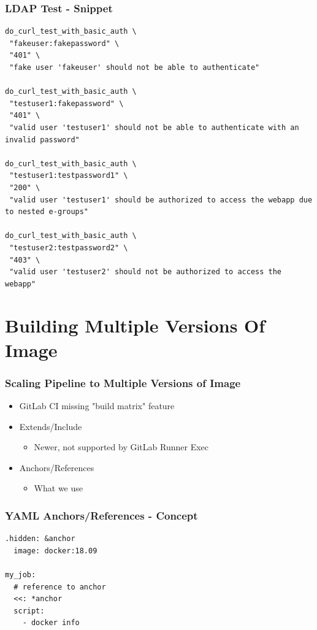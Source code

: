 \documentclass[14pt,aspectratio=169]{beamer}
\begin{document}
\begin{frame}[fragile]
  \frametitle{LDAP Test - Snippet}
  \begin{verbatim}
do_curl_test_with_basic_auth \
 "fakeuser:fakepassword" \
 "401" \
 "fake user 'fakeuser' should not be able to authenticate"

do_curl_test_with_basic_auth \
 "testuser1:fakepassword" \
 "401" \
 "valid user 'testuser1' should not be able to authenticate with an invalid password"

do_curl_test_with_basic_auth \
 "testuser1:testpassword1" \
 "200" \
 "valid user 'testuser1' should be authorized to access the webapp due to nested e-groups"

do_curl_test_with_basic_auth \
 "testuser2:testpassword2" \
 "403" \
 "valid user 'testuser2' should not be authorized to access the webapp"
  \end{verbatim}
\end{frame}

\section{Building Multiple Versions Of Image}

\begin{frame}[fragile]
  \frametitle{Scaling Pipeline to Multiple Versions of Image}
  \begin{itemize}
    \item GitLab CI missing "build matrix" feature
    \item Extends/Include
    \begin{itemize}
      \item Newer, not supported by GitLab Runner Exec
    \end{itemize}
    \item Anchors/References
    \begin{itemize}
      \item What we use
    \end{itemize}
  \end{itemize}
\end{frame}

\begin{frame}[fragile]
  \frametitle{YAML Anchors/References - Concept}
  \begin{verbatim}
.hidden: &anchor
  image: docker:18.09

my_job:
  # reference to anchor
  <<: *anchor
  script:
    - docker info
  \end{verbatim}
\end{frame}
\end{document}
